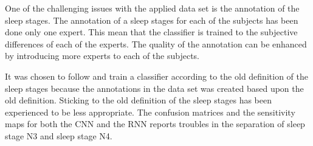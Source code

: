 One of the challenging issues with the applied data set is the annotation of the sleep stages. The annotation of a sleep stages for each of the subjects has been done only one expert. This mean that the classifier is trained to the subjective differences of each of the experts. The quality of the annotation can be enhanced by introducing more experts to each of the subjects.

It was chosen to follow and train a classifier according to the old definition of the sleep stages because the annotations in the data set was created based upon the old definition. Sticking to the old definition of the sleep stages has been experienced to be less appropriate. The confusion matrices and the sensitivity maps for both the CNN and the RNN reports troubles in the separation of sleep stage N3 and sleep stage N4. 

